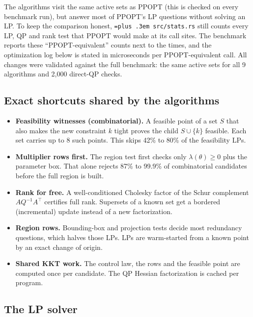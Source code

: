 \documentclass[10pt,a4paper]{article}
\newcommand{\ppopt}{PPOPT}
\newcommand{\code}[1]{{\let\_\bu\texttt{\spaceskip=\fontdimen2\font plus .3em #1}}}
\newcommand{\bu}{\textunderscore\hspace{0pt}}
\begin{document}
The algorithms visit the same active sets as \ppopt{} (this is checked on every benchmark run), but answer most of
\ppopt{}'s LP questions without solving an LP. To keep the comparison honest, \code{src/stats.rs} still counts every LP, QP and
rank test that \ppopt{} would make at its call sites. The benchmark reports these ``\ppopt{}-equivalent'' counts next to the
times, and the optimization log below is stated in microseconds per \ppopt{}-equivalent call. All changes were validated against
the full benchmark: the same active sets for all 9 algorithms and 2,000 direct-QP checks.

\subsection{Exact shortcuts shared by the algorithms}

\begin{itemize}
  \item \textbf{Feasibility witnesses (combinatorial).} A feasible point of a set $S$ that also makes the new constraint $k$ tight
    proves the child $S\cup\{k\}$ feasible. Each set carries up to 8 such points. This skips 42\% to 80\% of the feasibility LPs.
  \item \textbf{Multiplier rows first.} The region test first checks only $\lambda(\theta)\ge0$ plus the parameter box. That alone
    rejects 87\% to 99.9\% of combinatorial candidates before the full region is built.
  \item \textbf{Rank for free.} A well-conditioned Cholesky factor of the Schur complement $AQ^{-1}A^\top$ certifies full rank.
    Supersets of a known set get a bordered (incremental) update instead of a new factorization.
  \item \textbf{Region rows.} Bounding-box and projection tests decide most redundancy questions, which halves those LPs. LPs are
    warm-started from a known point by an exact change of origin.
  \item \textbf{Shared KKT work.} The control law, the rows and the feasible point are computed once per candidate. The QP Hessian
    factorization is cached per program.
\end{itemize}

\subsection{The LP solver}
\end{document}
